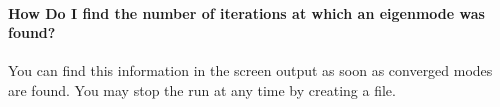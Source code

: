 \paragraph{How Do I find the number of iterations at which an eigenmode was found?}
You can find this information in the screen output as soon as
converged modes are found. You may stop the run at any time
by creating a  file.



